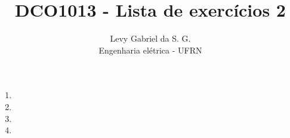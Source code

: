 \title{DCO1013 - Lista de exercícios 2}
\author{Levy Gabriel da S. G. \\ Engenharia elétrica - UFRN}

\maketitle
\thispagestyle{fancy}

\begin{enumerate}
    \item 
    \item 
    \item 
    \item 
\end{enumerate}